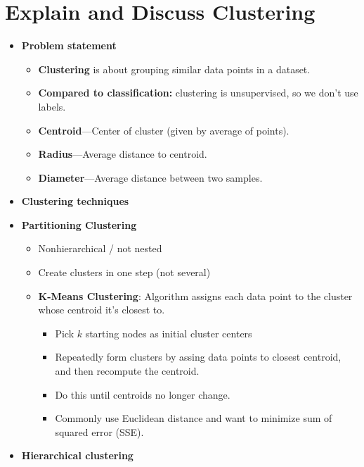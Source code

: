 
\section{Explain and Discuss Clustering}
\begin{multicols}{2}
\begin{itemize}
\item
  \textbf{Problem statement}

  \begin{itemize}
    \item
    \textbf{Clustering} is about grouping similar data points in a
    dataset.
  \item
    \textbf{Compared to classification:} clustering is unsupervised, so
    we don't use labels.
  \item
    \textbf{Centroid}---Center of cluster (given by average of points).
  \item
    \textbf{Radius}---Average distance to centroid.
  \item
    \textbf{Diameter}---Average distance between two samples.
  \end{itemize}
\item
  \textbf{Clustering techniques}
\item
  \textbf{Partitioning Clustering}

  \begin{itemize}
    \item
    Nonhierarchical / not nested
  \item
    Create clusters in one step (not several)
  \item
    \textbf{K-Means Clustering}: Algorithm assigns each data point to
    the cluster whose centroid it's closest to.

    \begin{itemize}
        \item
      Pick \(k\) starting nodes as initial cluster centers
    \item
      Repeatedly form clusters by assing data points to closest
      centroid, and then recompute the centroid.
    \item
      Do this until centroids no longer change.
    \item
      Commonly use Euclidean distance and want to minimize sum of
      squared error (SSE).
    \end{itemize}
  \end{itemize}
\item
  \textbf{Hierarchical clustering}


\end{itemize}
\end{multicols}
